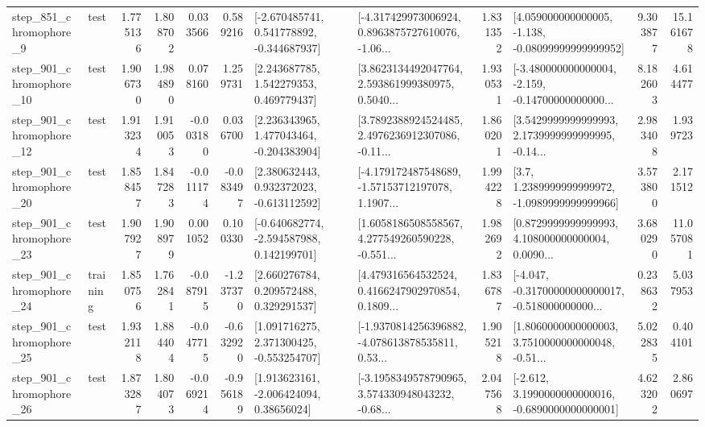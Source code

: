 \begin{tabular}{llrrrrllrlrr}
   step\_851\_chromophore\_9 &      test &      1.775136 &    1.808702 &      0.033566 &  0.589216 &   [-2.670485741, 0.541778892, -0.344687937] &  [-4.317429973006924, 0.8963875727610076, -1.06... &       1.831352 &  [4.059000000000005, -1.138, -0.08099999999999952] &            9.303877 &         15.161678 \\
  step\_901\_chromophore\_10 &      test &      1.906730 &    1.984890 &      0.078160 &  1.259731 &     [2.243687785, 1.542279353, 0.469779437] &  [3.8623134492047764, 2.593861999380975, 0.5040... &       1.930531 &  [-3.480000000000004, -2.159, -0.14700000000000... &            8.182603 &          4.614477 \\
  step\_901\_chromophore\_12 &      test &      1.913234 &    1.910053 &     -0.003180 &  0.036700 &    [2.236343965, 1.477043464, -0.204383904] &  [3.7892388924524485, 2.4976236912307086, -0.11... &       1.860201 &  [3.5429999999999993, 2.1739999999999995, -0.14... &            2.983408 &          1.939723 \\
  step\_901\_chromophore\_20 &      test &      1.858457 &    1.847283 &     -0.011174 & -0.083497 &    [2.380632443, 0.932372023, -0.613112592] &  [-4.179172487548689, -1.57153712197078, 1.1907... &       1.994228 &     [3.7, 1.2389999999999972, -1.0989999999999966] &            3.573800 &          2.171512 \\
  step\_901\_chromophore\_23 &      test &      1.907927 &    1.908979 &      0.001052 &  0.100330 &   [-0.640682774, -2.594587988, 0.142199701] &  [1.6058186508558567, 4.277549260590228, -0.551... &       1.982692 &  [0.8729999999999993, 4.108000000000004, 0.0090... &            3.680290 &         11.057081 \\
  step\_901\_chromophore\_24 &  training &      1.850756 &    1.762841 &     -0.087915 & -1.237370 &     [2.660276784, 0.209572488, 0.329291537] &  [4.479316564532524, 0.4166247902970854, 0.1809... &       1.836787 &  [-4.047, -0.31700000000000017, -0.518000000000... &            0.238632 &          5.037953 \\
  step\_901\_chromophore\_25 &      test &      1.932118 &    1.884404 &     -0.047715 & -0.632920 &    [1.091716275, 2.371300425, -0.553254707] &  [-1.9370814256396882, -4.078613878535811, 0.53... &       1.905218 &  [1.8060000000000003, 3.7510000000000048, -0.51... &            5.022835 &          0.404101 \\
  step\_901\_chromophore\_26 &      test &      1.873287 &    1.804073 &     -0.069214 & -0.956189 &     [1.913623161, -2.006424094, 0.38656024] &  [-3.1958349578790965, 3.574330948043232, -0.68... &       2.047568 &  [-2.612, 3.1990000000000016, -0.6890000000000001] &            4.623202 &          2.860697 \\

\end{tabular}
